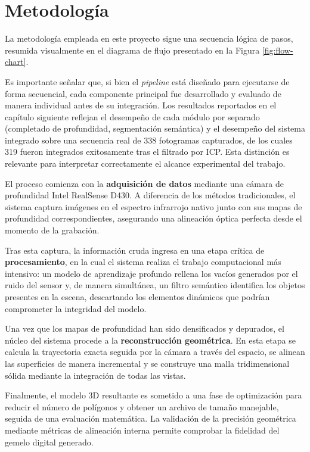\documentclass[12pt, a4, twoside, openany]{report}
\begin{document}
\chapter{Metodología}

La metodología empleada en este proyecto sigue una secuencia lógica de pasos, resumida visualmente en el diagrama de flujo presentado en la Figura \ref{fig:flow-chart}.

Es importante señalar que, si bien el \textit{pipeline} está diseñado para ejecutarse de forma secuencial, cada componente principal fue desarrollado y evaluado de manera individual antes de su integración. Los resultados reportados en el capítulo siguiente reflejan el desempeño de cada módulo por separado (completado de profundidad, segmentación semántica) y el desempeño del sistema integrado sobre una secuencia real de 338 fotogramas capturados, de los cuales 319 fueron integrados exitosamente tras el filtrado por ICP. Esta distinción es relevante para interpretar correctamente el alcance experimental del trabajo.

El proceso comienza con la \textbf{adquisición de datos} mediante una cámara de profundidad Intel RealSense D430. A diferencia de los métodos tradicionales, el sistema captura imágenes en el espectro infrarrojo nativo junto con sus mapas de profundidad correspondientes, asegurando una alineación óptica perfecta desde el momento de la grabación.

Tras esta captura, la información cruda ingresa en una etapa crítica de \textbf{procesamiento}, en la cual el sistema realiza el trabajo computacional más intensivo: un modelo de aprendizaje profundo rellena los vacíos generados por el ruido del sensor y, de manera simultánea, un filtro semántico identifica los objetos presentes en la escena, descartando los elementos dinámicos que podrían comprometer la integridad del modelo.

Una vez que los mapas de profundidad han sido densificados y depurados, el núcleo del sistema procede a la \textbf{reconstrucción geométrica}. En esta etapa se calcula la trayectoria exacta seguida por la cámara a través del espacio, se alinean las superficies de manera incremental y se construye una malla tridimensional sólida mediante la integración de todas las vistas.

Finalmente, el modelo 3D resultante es sometido a una fase de optimización para reducir el número de polígonos y obtener un archivo de tamaño manejable, seguida de una evaluación matemática. La validación de la precisión geométrica mediante métricas de alineación interna permite comprobar la fidelidad del gemelo digital generado.
\end{document}
